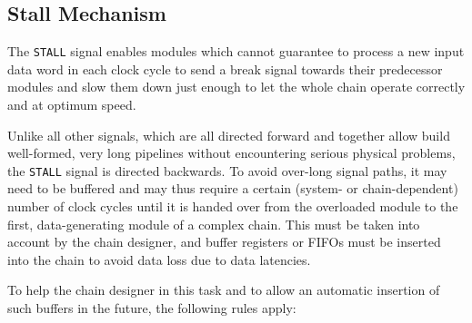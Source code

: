 \subsection{Stall Mechanism} \label{05-03-stall}

The \texttt{STALL} signal enables modules which cannot guarantee to process a new input data word in each clock cycle to send a break signal towards their predecessor modules and slow them down just enough to let the whole chain operate correctly and at optimum speed.

Unlike all other signals, which are all directed forward and together allow build well-formed, very long pipelines without encountering serious physical problems, the \texttt{STALL} signal is directed backwards. To avoid over-long signal paths, it may need to be buffered and may thus require a certain (system- or chain-dependent) number of clock cycles until it is handed over from the overloaded module to the first, data-generating module of a complex chain. This must be taken into account by the chain designer, and buffer registers or FIFOs must be inserted into the chain to avoid data loss due to data latencies.

To help the chain designer in this task and to allow an automatic insertion of such buffers in the future, the following rules apply:

